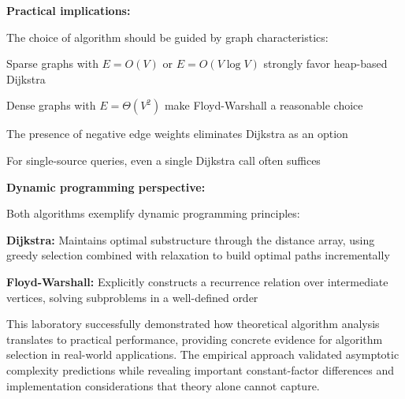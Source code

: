 \documentclass[12pt, a4paper]{report}
\begin{document}
\textbf{Practical implications:}

The choice of algorithm should be guided by graph characteristics:
\begin{dashenum}
  \item Sparse graphs with $E = O(V)$ or $E = O(V \log V)$ strongly favor heap-based Dijkstra
  \item Dense graphs with $E = \Theta(V^2)$ make Floyd-Warshall a reasonable choice
  \item The presence of negative edge weights eliminates Dijkstra as an option
  \item For single-source queries, even a single Dijkstra call often suffices
\end{dashenum}

\textbf{Dynamic programming perspective:}

Both algorithms exemplify dynamic programming principles:
\begin{dashenum}
  \item \textbf{Dijkstra:} Maintains optimal substructure through the distance array, using greedy selection combined with relaxation to build optimal paths incrementally
  \item \textbf{Floyd-Warshall:} Explicitly constructs a recurrence relation over intermediate vertices, solving subproblems in a well-defined order
\end{dashenum}

This laboratory successfully demonstrated how theoretical algorithm analysis translates to practical performance, providing concrete evidence for algorithm selection in real-world applications. The empirical approach validated asymptotic complexity predictions while revealing important constant-factor differences and implementation considerations that theory alone cannot capture.
\end{document}

